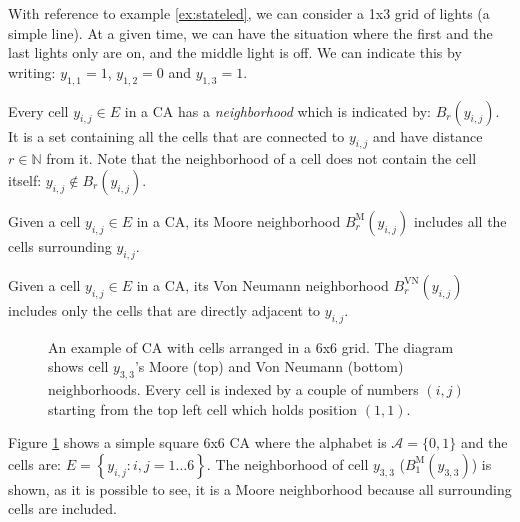 \begin{example}
\label{ex:stateled2}
With reference to example \ref{ex:stateled}, we can consider a 1x3 grid of lights (a simple line).
At a given time, we can have the situation where the first and the last lights only are on, and
the middle light is off. We can indicate this by writing: $y_{1,1}=1$, $y_{1,2}=0$ and $y_{1,3}=1$. 
\end{example}

\begin{definition}[Neighborhood]
\label{def:neigh}
Every cell $y_{i,j} \in E$ in a CA has a \textit{neighborhood} which is indicated by: 
$B_r\left( y_{i,j} \right)$. It is a set containing all the cells that are connected to
$y_{i,j}$ and have distance $r \in \mathbb{N}$ from it. Note that the neighborhood of a cell does
not contain the cell itself: $y_{i,j} \not\in B_r\left( y_{i,j} \right)$.
\end{definition}

\begin{definition}
\label{def:neighmoore}
Given a cell $y_{i,j} \in E$ in a CA, its Moore neighborhood $B^\text{M}_r\left( y_{i,j} \right)$
includes all the cells surrounding
$y_{i,j}$.
\end{definition}

\begin{definition}
\label{def:neighmoore}
Given a cell $y_{i,j} \in E$ in a CA, its Von Neumann neighborhood $B^\text{VN}_r\left( y_{i,j} \right)$
includes only the cells that are
directly adjacent to $y_{i,j}$.
\end{definition}

%
\begin{figure}[b]
\sidecaption

%
%
\caption{An example of CA with cells arranged in a 6x6 grid. The diagram shows cell $y_{3,3}$'s
Moore (top) and Von Neumann (bottom) neighborhoods.
Every cell is indexed by a couple of numbers $(i,j)$ starting
from the top left cell which holds position $(1,1)$.}
\label{fig:exampleca}
\end{figure}
%

\begin{example}
\label{ex:simpleca}
Figure \ref{fig:exampleca} shows a simple square 6x6 CA
where the alphabet is $\mathcal{A}=\{ 0, 1 \}$ and the
cells are: $E = \left\{ y_{i,j} : i,j = 1 \dots 6 \right\}$. The neighborhood of cell $y_{3,3}$
($B^\text{M}_1\left( y_{3,3} \right)$)
is shown, as it is possible to see, it is a Moore neighborhood because all surrounding cells are
included.
\end{example}

